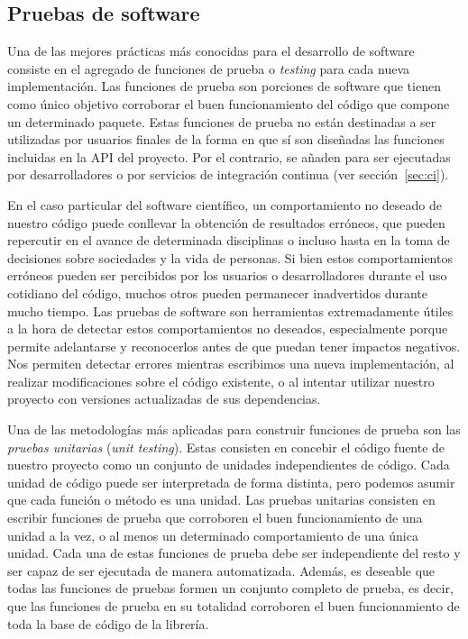 \subsection{Pruebas de software}

Una de las mejores prácticas más conocidas para el desarrollo de software
consiste en el agregado de funciones de prueba o \emph{testing} para cada nueva
implementación.
Las funciones de prueba son porciones de software que tienen como único
objetivo corroborar el buen funcionamiento del código que compone un
determinado paquete.
Estas funciones de prueba no están destinadas a ser utilizadas por usuarios
finales de la forma en que sí son diseñadas las funciones incluidas en la
\ac{API} del proyecto.
Por el contrario, se añaden para ser ejecutadas por desarrolladores o por
servicios de integración continua (ver sección~\ref{sec:ci}).

En el caso particular del software científico, un comportamiento no deseado de
nuestro código puede conllevar la obtención de resultados erróneos, que pueden
repercutir en el avance de determinada disciplinas o incluso hasta en la toma
de decisiones sobre sociedades y la vida de personas.
Si bien estos comportamientos erróneos pueden ser percibidos por los usuarios
o desarrolladores durante el uso cotidiano del código, muchos otros pueden
permanecer inadvertidos durante mucho tiempo.
Las pruebas de software son herramientas extremadamente útiles a la hora de
detectar estos comportamientos no deseados, especialmente porque permite
adelantarse y reconocerlos antes de que puedan tener impactos negativos.
Nos permiten detectar errores mientras escribimos una nueva implementación, al
realizar modificaciones sobre el código existente, o al intentar utilizar
nuestro proyecto con versiones actualizadas de sus dependencias.

Una de las metodologías más aplicadas para construir funciones de prueba son
las \emph{pruebas unitarias} (\emph{unit testing}).
Estas consisten en concebir el código fuente de nuestro proyecto como un
conjunto de unidades independientes de código.
Cada unidad de código puede ser interpretada de forma distinta, pero podemos
asumir que cada función o método es una unidad.
Las pruebas unitarias consisten en escribir funciones de prueba que corroboren
el buen funcionamiento de una unidad a la vez, o al menos un determinado
comportamiento de una única unidad.
Cada una de estas funciones de prueba debe ser independiente del resto y ser
capaz de ser ejecutada de manera automatizada.
Además, es deseable que todas las funciones de pruebas formen un conjunto
completo de prueba, es decir, que las funciones de prueba en su totalidad
corroboren el buen funcionamiento de toda la base de código de la librería.

